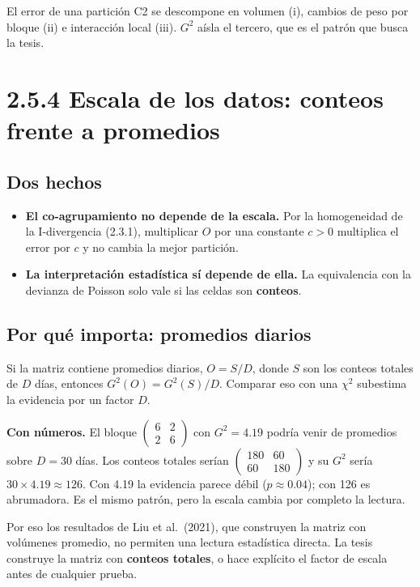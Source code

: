\documentclass[11pt,a4paper]{article}
\newenvironment{idea}{\par\begin{center}\begin{lrbox}{\ideabox}\begin{minipage}{0.9\linewidth}}{\end{minipage}\end{lrbox}\fcolorbox{blue!40!black}{blue!5}{\usebox{\ideabox}}\end{center}}
\begin{document}
\begin{idea}
El error de una partición C2 se descompone en volumen (i), cambios de peso por
bloque (ii) e interacción local (iii). $G^2$ aísla el tercero, que es el patrón que
busca la tesis.
\end{idea}

\section{2.5.4 Escala de los datos: conteos frente a promedios}

\subsection{Dos hechos}

\begin{itemize}
  \item \textbf{El co-agrupamiento no depende de la escala.} Por la homogeneidad
  de la I-divergencia (2.3.1), multiplicar $O$ por una constante $c>0$ multiplica
  el error por $c$ y no cambia la mejor partición.
  \item \textbf{La interpretación estadística sí depende de ella.} La equivalencia
  con la devianza de Poisson solo vale si las celdas son \textbf{conteos}.
\end{itemize}

\subsection{Por qué importa: promedios diarios}

Si la matriz contiene promedios diarios, $O=S/D$, donde $S$ son los conteos
totales de $D$ días, entonces $G^2(O)=G^2(S)/D$. Comparar eso con una $\chi^2$
subestima la evidencia por un factor $D$.

\textbf{Con números.} El bloque $\begin{pmatrix}6&2\\2&6\end{pmatrix}$ con
$G^2=4.19$ podría venir de promedios sobre $D=30$ días. Los conteos totales serían
$\begin{pmatrix}180&60\\60&180\end{pmatrix}$ y su $G^2$ sería
$30\times4.19\approx126$. Con 4.19 la evidencia parece débil ($p\approx0.04$); con
126 es abrumadora. Es el mismo patrón, pero la escala cambia por completo la
lectura.

Por eso los resultados de Liu et al.\ (2021), que construyen la matriz con
volúmenes promedio, no permiten una lectura estadística directa. La tesis
construye la matriz con \textbf{conteos totales}, o hace explícito el factor de
escala antes de cualquier prueba.
\end{document}
